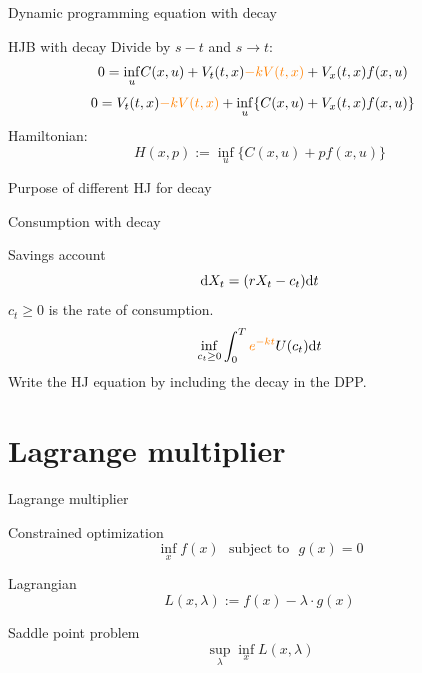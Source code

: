 \documentclass[color=usenames,dvipsnames]{beamer}
\newcommand{\dd}{\text{\normalfont d}}
\newcommand{\dt}{\text{\normalfont d}t}
\begin{document}
\begin{frame}{Dynamic programming equation with decay}
        \begin{block}
        {HJB with decay}
        Divide by $s-t$ and $s\to t$:
        \[
        \begin{split}
            0=\inf_{u} &C(x,u) + V_t(t,x) {\color{orange}- k V(t,x)}+ V_x(t,x)f(x,u)
        \end{split}
        \]
        \[
        \begin{split}
            0= V_t(t,x) {\color{orange}- k V(t,x)}+\inf_{u} &\{C(x,u) + V_x(t,x)f(x,u)\}
        \end{split}
        \]
        Hamiltonian: 
        \[
        H(x,p):= \inf_{u} \{C(x,u) + pf(x,u)\}
        \]
    \end{block}
\end{frame}
\begin{frame}{Purpose of different HJ for decay}
    
\end{frame}

\begin{frame}{Consumption with decay}
    \begin{block}
        {Savings account}
        \[
        \dd{X}_t = (rX_t - c_t)\dt
        \]
        $c_t\ge0$ is the rate of consumption.
        \[
        \inf_{c_t\ge0} \int_0^T {\color{orange}e^{-kt}}U(c_t)\dt
        \]
        Write the HJ equation by including the decay in the DPP.
    \end{block}
\end{frame}


\section{Lagrange multiplier}
\begin{frame}{Lagrange multiplier}
    \begin{block}
        {Constrained optimization}
        \[
        \inf_x f(x) ~~~ \textrm{subject to}~~~g(x)=0
        \]
    \end{block}
    \begin{block}
        {Lagrangian}
        \[
        L(x,\lambda):= f(x) - \lambda \cdot g(x)
        \]
    \end{block}
    \begin{block}
        {Saddle point problem}
        \[
        \sup_{\lambda}\inf_{x}L(x,\lambda)
        \]
    \end{block}
\end{frame}
\end{document}
